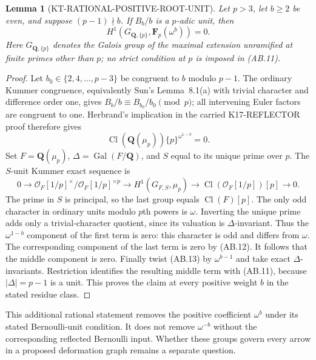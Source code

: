 \documentclass[11pt,a4paper]{article}
\newtheorem{lemma}[theorem]{Lemma}
\theoremstyle{definition}
\begin{document}
\begin{lemma}[KT-RATIONAL-POSITIVE-ROOT-UNIT]
Let $p>3$, let $b\ge2$ be even, and suppose
$(p-1)\nmid b$.  If $B_b/b$ is a $p$-adic unit, then
\[
              H^1(G_{\mathbf Q,\{p\}},
                         \mathbf F_p(\omega^b))=0.       \tag{AB.11}
\]
Here $G_{\mathbf Q,\{p\}}$ denotes the Galois group of the
maximal extension unramified at finite primes other than
$p$; no strict condition at $p$ is imposed in (AB.11).
\end{lemma}
\begin{proof}
Let $b_0\in\{2,4,\ldots,p-3\}$ be congruent to $b$
modulo $p-1$.  The ordinary Kummer congruence, equivalently
Sun's Lemma~8.1(a) with trivial character and difference
order one, gives $B_b/b\equiv B_{b_0}/b_0\pmod p$;
all intervening Euler factors are congruent to one.
Herbrand's implication in the carried K17-REFLECTOR proof
therefore gives
\[
 \operatorname{Cl}(\mathbf Q(\mu_p))\{p\}^{\omega^{1-b}}=0.
                                                               \tag{AB.12}
\]
Set $F=\mathbf Q(\mu_p)$, $\Delta=\operatorname{Gal}(F/\mathbf Q)$,
and $S$ equal to its unique prime over $p$.  The $S$-unit
Kummer exact sequence is
\[
 0\longrightarrow\mathcal O_F[1/p]^\times/
                    \mathcal O_F[1/p]^{\times p}
 \longrightarrow H^1(G_{F,S},\mu_p)
 \longrightarrow\operatorname{Cl}(\mathcal O_F[1/p])[p]
 \longrightarrow0.                                      \tag{AB.13}
\]
The prime in $S$ is principal, so the last group equals
$\operatorname{Cl}(F)[p]$.  The only odd character in
ordinary units modulo $p$th powers is $\omega$.
Inverting the unique prime adds only a trivial-character
quotient, since its valuation is $\Delta$-invariant.
Thus the $\omega^{1-b}$ component of the first term is
zero: this character is odd and differs from $\omega$.
The corresponding component of the last term is zero
by (AB.12).  It follows that the middle component is zero.
Finally twist (AB.13) by $\omega^{b-1}$ and take exact
$\Delta$-invariants.  Restriction identifies the resulting
middle term with (AB.11), because $|\Delta|=p-1$ is a unit.
This proves the claim at every positive weight $b$ in the
stated residue class.
\end{proof}

This additional rational statement removes the positive
coefficient $\omega^b$ under its stated Bernoulli-unit
condition.  It does not remove $\omega^{-b}$ without
the corresponding reflected Bernoulli input.  Whether
these groups govern every arrow in a proposed deformation
graph remains a separate question.
\end{document}
